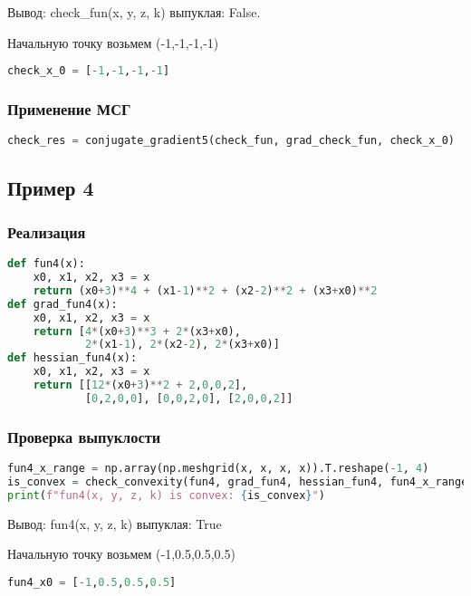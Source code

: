 \documentclass{article}
\begin{document}
Вывод: check\_fun(x, y, z, k) выпуклая: False.

Начальную точку возьмем (-1,-1,-1,-1)

\begin{lstlisting}[language=Python]
check_x_0 = [-1,-1,-1,-1]
\end{lstlisting}

\subsubsection{Применение МСГ}

\begin{lstlisting}[language=Python]
check_res = conjugate_gradient5(check_fun, grad_check_fun, check_x_0)
\end{lstlisting}

\newpage
\subsection{Пример 4}

\subsubsection{Реализация}
\begin{lstlisting}[language=Python]
def fun4(x):
    x0, x1, x2, x3 = x
    return (x0+3)**4 + (x1-1)**2 + (x2-2)**2 + (x3+x0)**2
def grad_fun4(x):
    x0, x1, x2, x3 = x
    return [4*(x0+3)**3 + 2*(x3+x0),
            2*(x1-1), 2*(x2-2), 2*(x3+x0)]
def hessian_fun4(x):
    x0, x1, x2, x3 = x
    return [[12*(x0+3)**2 + 2,0,0,2],
            [0,2,0,0], [0,0,2,0], [2,0,0,2]]
\end{lstlisting}

\subsubsection{Проверка выпуклости}
\begin{lstlisting}[language=Python]
fun4_x_range = np.array(np.meshgrid(x, x, x, x)).T.reshape(-1, 4)
is_convex = check_convexity(fun4, grad_fun4, hessian_fun4, fun4_x_range)
print(f"fun4(x, y, z, k) is convex: {is_convex}")
\end{lstlisting}

Вывод: fun4(x, y, z, k) выпуклая: True

Начальную точку возьмем (-1,0.5,0.5,0.5)

\begin{lstlisting}[language=Python]
fun4_x0 = [-1,0.5,0.5,0.5]
\end{lstlisting}
\end{document}
